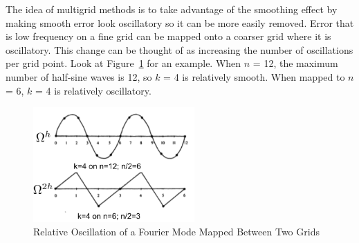 The idea of multigrid methods is to take advantage of the smoothing effect by making smooth error look oscillatory so it can be more easily removed. Error that is low frequency on a fine grid can be mapped onto a coarser grid where it is oscillatory. This change can be thought of as increasing the number of oscillations per grid point. Look at Figure~\ref{fig:FourierGridError} for an example. When $n$ = 12, the maximum number of half-sine waves is 12, so $k$ = 4 is relatively smooth. When mapped to $n$ = 6, $k$ = 4 is relatively oscillatory. 
%
\begin{figure}[!ht]
    \begin{center}
      \includegraphics [width=0.55\textwidth, height=0.33\textheight] {FourierGridError}
   \end{center}
   \caption{Relative Oscillation of a Fourier Mode Mapped Between Two Grids \cite{Briggs2000}}
   \label{fig:FourierGridError}
\end{figure}


